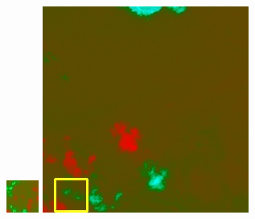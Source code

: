 \documentclass[10pt,UTF8,fntef]{ctexart}
\begin{document}
\begin{multicols}{2}
\begin{figure}[H]
{\begin{minipage}[b]{0.15\linewidth}
            \includegraphics[width=1\linewidth]{../log/spoon4/cut/tmp_cut_LC80980712014024LGN00_15440_spectral.jpg}\vspace{4pt}
            \includegraphics[width=1\linewidth]{../log/spoon4/cut/LC81390292014135LGN00_14081_spectral.jpg}\vspace{4pt}

\end{minipage}}
\end{figure}
\end{multicols}
\end{document}
